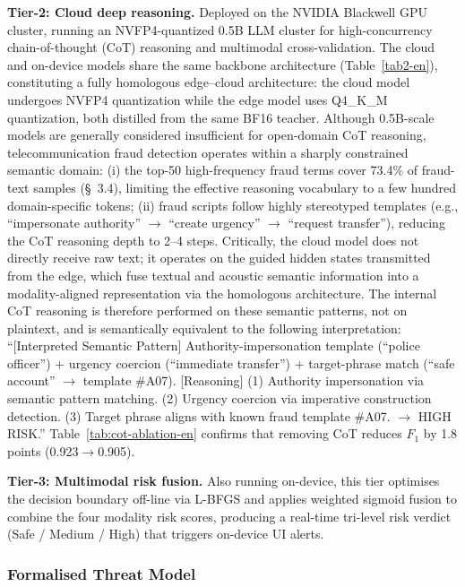 \documentclass[11pt, a4paper]{article}
\begin{document}
\textbf{Tier-2: Cloud deep reasoning.} Deployed on the NVIDIA Blackwell GPU cluster, running an NVFP4-quantized 0.5B LLM cluster for high-concurrency chain-of-thought (CoT) reasoning and multimodal cross-validation. The cloud and on-device models share the same backbone architecture (Table~\ref{tab2-en}), constituting a fully homologous edge--cloud architecture: the cloud model undergoes NVFP4 quantization while the edge model uses Q4\_K\_M quantization, both distilled from the same BF16 teacher. Although 0.5B-scale models are generally considered insufficient for open-domain CoT reasoning, telecommunication fraud detection operates within a sharply constrained semantic domain: (i) the top-50 high-frequency fraud terms cover 73.4\% of fraud-text samples (\S~3.4), limiting the effective reasoning vocabulary to a few hundred domain-specific tokens; (ii) fraud scripts follow highly stereotyped templates (e.g., ``impersonate authority'' $\rightarrow$ ``create urgency'' $\rightarrow$ ``request transfer''), reducing the CoT reasoning depth to 2--4 steps. Critically, the cloud model does not directly receive raw text; it operates on the guided hidden states transmitted from the edge, which fuse textual and acoustic semantic information into a modality-aligned representation via the homologous architecture. The internal CoT reasoning is therefore performed on these semantic patterns, not on plaintext, and is semantically equivalent to the following interpretation: ``[Interpreted Semantic Pattern] Authority-impersonation template (``police officer'') + urgency coercion (``immediate transfer'') + target-phrase match (``safe account'' $\rightarrow$ template \#A07).
[Reasoning] (1) Authority impersonation via semantic pattern matching. (2) Urgency coercion via imperative construction detection. (3) Target phrase aligns with known fraud template \#A07. $\rightarrow$ HIGH RISK.'' Table~\ref{tab:cot-ablation-en} confirms that removing CoT reduces $F_1$ by 1.8 points (0.923$\rightarrow$0.905).

\textbf{Tier-3: Multimodal risk fusion.} Also running on-device, this tier optimises the decision boundary off-line via L-BFGS and applies weighted sigmoid fusion to combine the four modality risk scores, producing a real-time tri-level risk verdict (Safe / Medium / High) that triggers on-device UI alerts.

\subsubsection{Formalised Threat Model}
\end{document}
